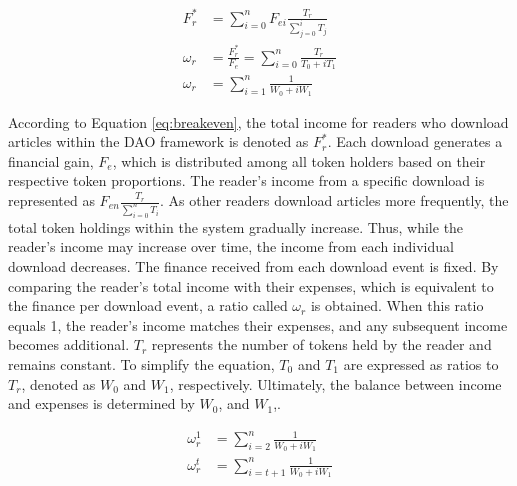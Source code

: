 \documentclass[lettersize,journal]{IEEEtran}
\begin{document}
\begin{equation}
  \begin{aligned}
    F_{r}^* & = \sum_{i=0}^{n} F_{ei} \frac{T_{r}}{\sum_{j=0}^{i}T_j} \\
    \omega_r & = \frac{F_{r}^*}{F_{e}} = \sum_{i=0}^{n} \frac{T_{r}}{T_0 + iT_1} \\
    \omega_r & = \sum_{i = 1}^{n} \frac{1}{W_0 + i W_1}
  \end{aligned}
  \label{eq:breakeven}
\end{equation}

According to Equation \ref{eq:breakeven}, the total income for readers who download articles within the DAO framework is denoted as $F_{r}^*$. Each download generates a financial gain, $F_{e}$, which is distributed among all token holders based on their respective token proportions. The reader's income from a specific download is represented as $F_{en} \frac{T_{r}}{\sum_{i=0}^{n}T_i}$. As other readers download articles more frequently, the total token holdings within the system gradually increase. Thus, while the reader's income may increase over time, the income from each individual download decreases. 
The finance received from each download event is fixed. By comparing the reader's total income with their expenses, which is equivalent to the finance per download event, a ratio called $\omega_r$ is obtained. When this ratio equals 1, the reader's income matches their expenses, and any subsequent income becomes additional. $T_r$ represents the number of tokens held by the reader and remains constant. To simplify the equation, $T_0$ and $T_1$ are expressed as ratios to $T_r$, denoted as $W_0$ and $W_1$, respectively. Ultimately, the balance between income and expenses is determined by $W_0$, and $W_1$,.


\begin{equation}
  \begin{aligned}
    \omega_r^1 & = \sum_{i = 2}^{n} \frac{1}{W_0 + i W_1} \\
    \omega_r^t & = \sum_{i = t + 1}^{n} \frac{1}{W_0 + i W_1}
  \end{aligned}
  \label{eq:evenotherreader}
\end{equation}
\end{document}
